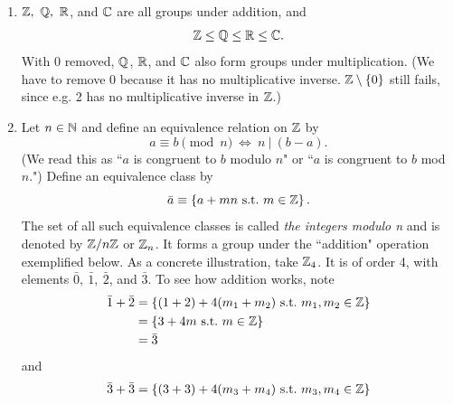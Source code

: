 \begin{example*}{}{}
\begin{enumerate}
  \item $\mathbb{Z},\ \mathbb{Q},\ \mathbb{R}$, and $\mathbb{C}$ are all groups
        under addition, and
        \begin{equation}
          \mathbb{Z} \leq \mathbb{Q} \leq \mathbb{R} \leq \mathbb{C}.
        \end{equation}
        With 0 removed, $\mathbb{Q}$, $\mathbb{R}$, and $\mathbb{C}$ also form groups under
        multiplication. (We have to remove 0 because it has no multiplicative
        inverse. $\mathbb{Z}\setminus\left\{0\right\}$ still fails, since e.g. 2 has no
        multiplicative inverse in $\mathbb{Z}$.)
  \item Let $n\in \mathbb{N}$ and define an equivalence relation on 
        $\mathbb{Z}$ by 
        \begin{equation}
          a\equiv b\pmod{n}\ \Leftrightarrow\ n\ |\ (b-a).
        \end{equation}
        (We read this as ``$a$ is congruent to $b$ modulo $ n$" or ``$a$ is
        congruent to $b$ mod $n$.") Define an equivalence class by 
        \begin{equation}
          \bar{a}\equiv\left\{a+mn ~\text{s.t.}~ m\in \mathbb{Z}\right\}.
        \end{equation}
        The set of all such equivalence classes is called {\it the integers 
        modulo n} and is denoted by 
        $\mathbb{Z}/n\mathbb{Z}$ or $\mathbb{Z}_n$. It forms a group 
        under the ``addition" operation exemplified below. As a concrete 
        illustration, take $\mathbb{Z}_4$. It is of order 4, with 
        elements $\bar{0},\ \bar{1},\ \bar{2}$, and $\bar{3}$. To see how 
        addition works, note
        \begin{equation}
          \label{eq:chgtmaad1}
          \begin{aligned}
            \bar{1}+\bar{2}&=\left\{(1+2)+4(m_{1}+m_{2}) ~\text{s.t.}~ m_{1},m_{2}
                             \in \mathbb{Z}\right\}\\
                         &=\left\{3+4m ~\text{s.t.}~ m\in \mathbb{Z}\right\}\\
                         &=\bar{3}
          \end{aligned}
        \end{equation}
        and
        \begin{equation}
          \label{eq:chgtmaad2}
          \begin{aligned}
            \bar{3}+\bar{3}&=\set{(3+3)+4(m_{3}+m_{4})\suchthat m_{3},m_{4}
                             \in \Z}\\

\end{aligned}
\end{equation}
\end{enumerate}
\end{example*}
